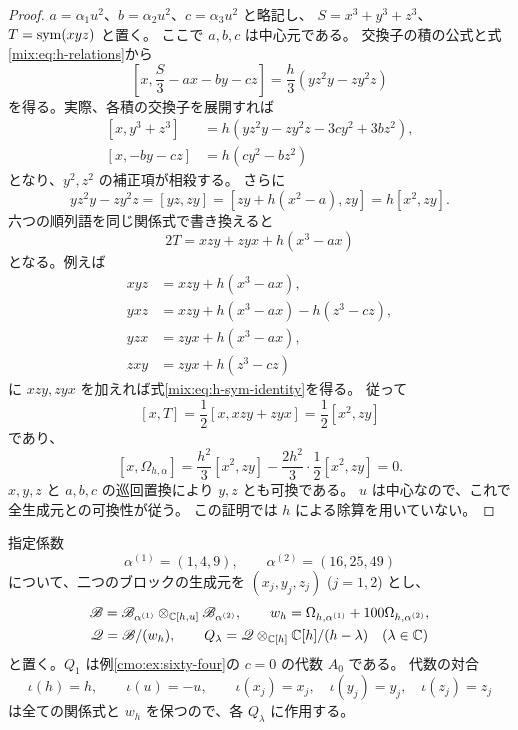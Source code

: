 \begin{proof}
$a=\alpha_1u^2$、$b=\alpha_2u^2$、$c=\alpha_3u^2$ と略記し、
$S=x^3+y^3+z^3$、$T=\operatorname{sym}(xyz)$ と置く。
ここで $a,b,c$ は中心元である。
交換子の積の公式と式\eqref{mix:eq:h-relations}から
\[
 \left[x,\frac{S}{3}-ax-by-cz\right]
 =\frac{h}{3}(yz^2y-zy^2z)
\]
を得る。実際、各積の交換子を展開すれば
\[
\begin{aligned}
 [x,y^3+z^3]&=h(yz^2y-zy^2z-3cy^2+3bz^2),\\
 [x,-by-cz]&=h(cy^2-bz^2)
\end{aligned}
\]
となり、$y^2,z^2$ の補正項が相殺する。
さらに
\[
 yz^2y-zy^2z=[yz,zy]
 =[zy+h(x^2-a),zy]=h[x^2,zy].
\]
六つの順列語を同じ関係式で書き換えると
\begin{equation}\label{mix:eq:h-sym-identity}
 2T=xzy+zyx+h(x^3-ax)
\end{equation}
となる。例えば
\[
\begin{aligned}
 xyz&=xzy+h(x^3-ax),\\
 yxz&=xzy+h(x^3-ax)-h(z^3-cz),\\
 yzx&=zyx+h(x^3-ax),\\
 zxy&=zyx+h(z^3-cz)
\end{aligned}
\]
に $xzy,zyx$ を加えれば式\eqref{mix:eq:h-sym-identity}を得る。
従って
\[
 [x,T]=\frac12[x,xzy+zyx]=\frac12[x^2,zy]
\]
であり、
\[
 [x,\Omega_{h,\alpha}]
 =\frac{h^2}{3}[x^2,zy]
   -\frac{2h^2}{3}\cdot\frac12[x^2,zy]=0.
\]
$x,y,z$ と $a,b,c$ の巡回置換により $y,z$ とも可換である。
$u$ は中心なので、これで全生成元との可換性が従う。
この証明では $h$ による除算を用いていない。
\end{proof}

指定係数
\[
 \alpha^{(1)}=(1,4,9),\qquad \alpha^{(2)}=(16,25,49)
\]
について、二つのブロックの生成元を $(x_j,y_j,z_j)$ ($j=1,2$) とし、
\begin{equation}\label{mix:eq:h-mixed-family}
\begin{gathered}
 \mathscr B=
 \mathscr B_{\alpha^{(1)}}\otimes_{\mathbb C[h,u]}
 \mathscr B_{\alpha^{(2)}},\qquad
 w_h=\Omega_{h,\alpha^{(1)}}+100\Omega_{h,\alpha^{(2)}},\\
 \mathscr Q=\mathscr B/(w_h),\qquad
 Q_\lambda=\mathscr Q\otimes_{\mathbb C[h]}\mathbb C[h]/(h-\lambda)
 \quad(\lambda\in\mathbb C)
\end{gathered}
\end{equation}
と置く。$Q_1$ は例\ref{cmo:ex:sixty-four}の $c=0$ の代数 $A_0$ である。
代数の対合
\[
 \iota(h)=h,\qquad \iota(u)=-u,\qquad
 \iota(x_j)=x_j,\quad\iota(y_j)=y_j,\quad\iota(z_j)=z_j
\]
は全ての関係式と $w_h$ を保つので、各 $Q_\lambda$ に作用する。

